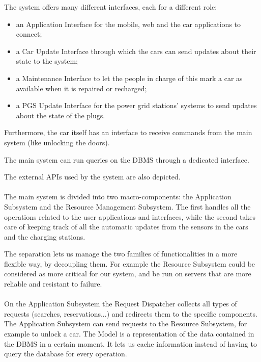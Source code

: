 \documentclass[english]{article}
\begin{document}
\newpage
The system offers many different interfaces, each for a different role:
\begin{itemize}
	\item{an Application Interface for the mobile, web and the car applications to connect;}
	\item{a Car Update Interface through which the cars can send updates about their state to the system;}
	\item{a Maintenance Interface to let the people in charge of this mark a car as available when it is repaired or recharged;}
	\item{a PGS Update Interface for the power grid stations' systems to send updates about the state of the plugs.}
\end{itemize}

Furthermore, the car itself has an interface to receive commands from the main system (like unlocking the doors).

The main system can run queries on the DBMS through a dedicated interface.

The external APIs used by the system are also depicted.

\paragraph{}
The main system is divided into two macro-components: the Application Subsystem and the Resource Management Subsystem.
The first handles all the operations related to the user applications and interfaces, while the second takes care of keeping track of all the automatic updates from the sensors in the cars and the charging stations.

The separation lets us manage the two families of functionalities in a more flexible way, by decoupling them. For example the Resource Subsystem could be considered as more critical for our system, and be run on servers that are more reliable and resistant to failure.

\paragraph{}
On the Application Subsystem the Request Dispatcher collects all types of requests (searches, reservations...) and redirects them to the specific components.
The Application Subsystem can send requests to the Resource Subsystem, for example to unlock a car.
The Model is a representation of the data contained in the DBMS in a certain moment. It lets us cache information instead of having to query the database for every operation.
\end{document}
